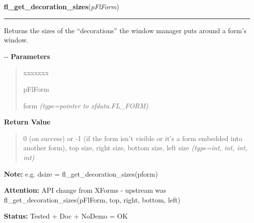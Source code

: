 \hspace{.8\funcindent}\begin{boxedminipage}{\funcwidth}

    \raggedright \textbf{fl\_get\_decoration\_sizes}(\textit{pFlForm})

    \vspace{-1.5ex}

    \rule{\textwidth}{0.5\fboxrule}
\setlength{\parskip}{2ex}

Returns the sizes of the ``decorations'' the window manager puts around
a form's window.

-{}-
\setlength{\parskip}{1ex}
      \textbf{Parameters}
      \vspace{-1ex}

      \begin{quote}
        \begin{Ventry}{xxxxxxx}

          \item[pFlForm]


form
            {\it (type=pointer to xfdata.FL\_FORM)}

        \end{Ventry}

      \end{quote}

      \textbf{Return Value}
    \vspace{-1ex}

      \begin{quote}

0 (on success) or -1 (if the form isn't visible or it's a form
embedded into another form), top size, right size, bottom size, left
size
      {\it (type=int, int, int, int)}

      \end{quote}

\textbf{Note:} 
e.g. dsize = fl\_get\_decoration\_sizes(pform)


\textbf{Attention:} 
API change from XForms - upstream was
fl\_get\_decoration\_sizes(pFlForm, top, right, bottom, left)


\textbf{Status:} 
Tested + Doc + NoDemo = OK


    \end{boxedminipage}

    \label{xformslib:flxbasic:fl_raise_form}

    \vspace{0.5ex}

